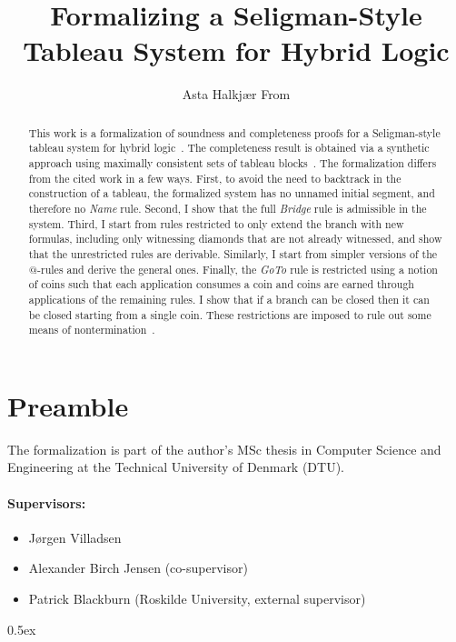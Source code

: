 \documentclass[11pt,a4paper]{article}
\begin{document}
\title{Formalizing a Seligman-Style Tableau System for Hybrid Logic}
\author{Asta Halkjær From}
\maketitle

\begin{abstract}
  This work is a formalization of soundness and completeness proofs for a Seligman-style tableau system for hybrid logic~\cite{jlog17}.
  The completeness result is obtained via a synthetic approach using maximally consistent sets of tableau blocks~\cite{aiml16}.
  The formalization differs from the cited work in a few ways.
  First, to avoid the need to backtrack in the construction of a tableau, the formalized system has no unnamed initial segment, and therefore no \textit{Name} rule.
  Second, I show that the full \textit{Bridge} rule is admissible in the system.
  Third, I start from rules restricted to only extend the branch with new formulas, including only witnessing diamonds that are not already witnessed, and show that the unrestricted rules are derivable.
  Similarly, I start from simpler versions of the \( @ \)-rules and derive the general ones.
  Finally, the \textit{GoTo} rule is restricted using a notion of coins such that each application consumes a coin and coins are earned through applications of the remaining rules.
  I show that if a branch can be closed then it can be closed starting from a single coin.
  These restrictions are imposed to rule out some means of nontermination~\cite{jlog17}.
\end{abstract}

\section*{Preamble}

The formalization is part of the author's MSc thesis in Computer Science and Engineering at the Technical University of Denmark (DTU).

\paragraph{Supervisors:}

\begin{itemize}
  \item Jørgen Villadsen
  \item Alexander Birch Jensen (co-supervisor)
  \item Patrick Blackburn (Roskilde University, external supervisor)
\end{itemize}

\newpage
\tableofcontents

\newpage

\parindent 0pt\parskip 0.5ex



\nocite{*}




\end{document}
